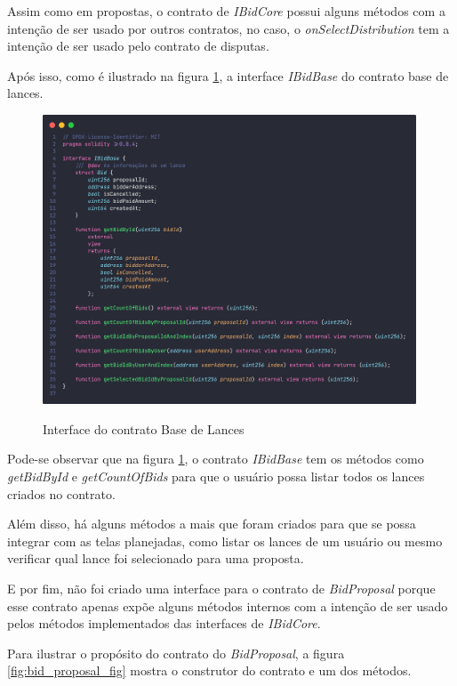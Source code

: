 Assim como em propostas, o contrato de \textit{IBidCore} possui alguns métodos com a intenção de ser usado por outros contratos, no caso, o \textit{onSelectDistribution} tem a intenção de ser usado pelo contrato de disputas.

Após isso, como é ilustrado na figura \ref{fig:bid_base_contract_fig}, a interface \textit{IBidBase} do contrato base de lances.

\begin{figure}[!h]
  \centering
  \caption{Interface do contrato Base de Lances}
  \includegraphics[width=420px]{src/images/contracts/bid_base.png}
  \label{fig:bid_base_contract_fig}
\end{figure}

Pode-se observar que na figura \ref{fig:bid_base_contract_fig}, o contrato \textit{IBidBase} tem os métodos como \textit{getBidById} e \textit{getCountOfBids} para que o usuário possa listar todos os lances criados no contrato.

Além disso, há alguns métodos a mais que foram criados para que se possa integrar com as telas planejadas, como listar os lances de um usuário ou mesmo verificar qual lance foi selecionado para uma proposta.

E por fim, não foi criado uma interface para o contrato de \textit{BidProposal} porque esse contrato apenas expõe alguns métodos internos com a intenção de ser usado pelos métodos implementados das interfaces de \textit{IBidCore}.

Para ilustrar o propósito do contrato do \textit{BidProposal}, a figura \ref{fig:bid_proposal_fig} mostra o construtor do contrato e um dos métodos.

